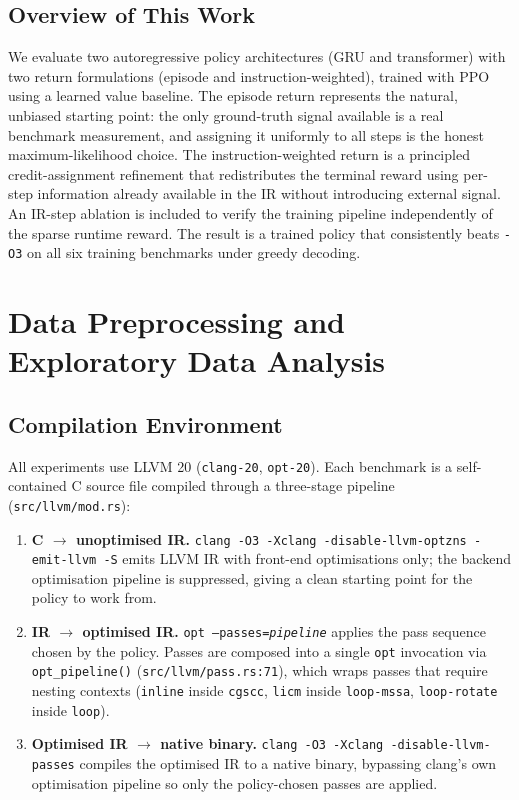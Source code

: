\documentclass[conference]{IEEEtran}
\newcommand{\opt}[1]{\texttt{-O#1}}
\newcommand{\pass}[1]{\texttt{#1}}
\begin{document}
\subsection{Overview of This Work}
We evaluate two autoregressive policy architectures (GRU and transformer)
with two return formulations (episode and instruction-weighted), trained
with PPO using a learned value baseline.
The episode return represents the natural, unbiased starting point: the only
ground-truth signal available is a real benchmark measurement, and assigning
it uniformly to all steps is the honest maximum-likelihood choice.
The instruction-weighted return is a principled credit-assignment refinement
that redistributes the terminal reward using per-step information already
available in the IR without introducing external signal.
An IR-step ablation is included to verify the training pipeline independently
of the sparse runtime reward.
The result is a trained policy that consistently beats \opt{3} on all six
training benchmarks under greedy decoding.

\section{Data Preprocessing and Exploratory Data Analysis}

\subsection{Compilation Environment}
\label{sec:compenv}
All experiments use LLVM 20 (\texttt{clang-20}, \texttt{opt-20}).
Each benchmark is a self-contained C source file compiled through a
three-stage pipeline (\texttt{src/llvm/mod.rs}):

\begin{enumerate}
  \item \textbf{C $\to$ unoptimised IR.}
        \texttt{clang -O3 -Xclang -disable-llvm-optzns -emit-llvm -S}
        emits LLVM IR with front-end optimisations only; the backend
        optimisation pipeline is suppressed, giving a clean starting point
        for the policy to work from.
  \item \textbf{IR $\to$ optimised IR.}
        \texttt{opt --passes=\textit{pipeline}} applies the pass sequence
        chosen by the policy.
        Passes are composed into a single \texttt{opt} invocation via
        \texttt{opt\_pipeline()} (\texttt{src/llvm/pass.rs:71}), which
        wraps passes that require nesting contexts
        (\pass{inline} inside \texttt{cgscc}, \pass{licm} inside
        \texttt{loop-mssa}, \pass{loop-rotate} inside \texttt{loop}).
  \item \textbf{Optimised IR $\to$ native binary.}
        \texttt{clang -O3 -Xclang -disable-llvm-passes} compiles the
        optimised IR to a native binary, bypassing clang's own
        optimisation pipeline so only the policy-chosen passes are applied.
\end{enumerate}
\end{document}
